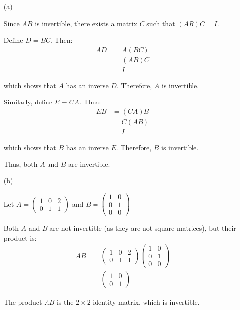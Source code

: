\documentclass{article}
\begin{document}
\begin{enumerate}
\item[(a)]

Since $AB$ is invertible, there exists a matrix $C$ such that $(AB)C = I$.

Define $D = BC$. Then:
\begin{align*}
AD &= A(BC) \\
&= (AB)C \\
&= I
\end{align*}

which shows that $A$ has an inverse $D$. Therefore, $A$ is invertible.

Similarly, define $E = CA$. Then:
\begin{align*}
EB &= (CA)B \\
&= C(AB) \\
&= I
\end{align*}

which shows that $B$ has an inverse $E$. Therefore, $B$ is invertible.

Thus, both $A$ and $B$ are invertible.

\item[(b)]

Let $A = \begin{pmatrix} 1 & 0 & 2 \\ 0 & 1 & 1 \end{pmatrix}$ and $B = \begin{pmatrix} 1 & 0 \\ 0 & 1 \\ 0 & 0 \end{pmatrix}$

Both $A$ and $B$ are not invertible (as they are not square matrices), but their product is:
\begin{align*}
AB &= \begin{pmatrix} 1 & 0 & 2 \\ 0 & 1 & 1 \end{pmatrix} \begin{pmatrix} 1 & 0 \\ 0 & 1 \\ 0 & 0 \end{pmatrix} \\
&= \begin{pmatrix} 1 & 0 \\ 0 & 1 \end{pmatrix}
\end{align*}

The product $AB$ is the $2 \times 2$ identity matrix, which is invertible.


\end{enumerate}
\end{document}
